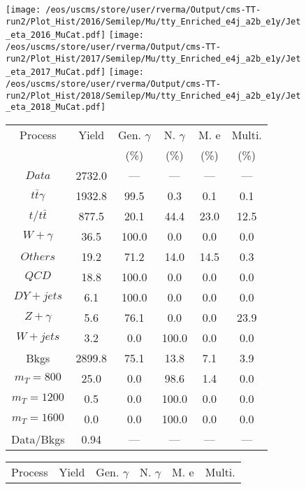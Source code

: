 \begin{figure}
\centering
\texttt{[image: /eos/uscms/store/user/rverma/Output/cms-TT-run2/Plot\_Hist/2016/Semilep/Mu/tty\_Enriched\_e4j\_a2b\_e1y/Jet\_eta\_2016\_MuCat.pdf]}
\texttt{[image: /eos/uscms/store/user/rverma/Output/cms-TT-run2/Plot\_Hist/2017/Semilep/Mu/tty\_Enriched\_e4j\_a2b\_e1y/Jet\_eta\_2017\_MuCat.pdf]}
\texttt{[image: /eos/uscms/store/user/rverma/Output/cms-TT-run2/Plot\_Hist/2018/Semilep/Mu/tty\_Enriched\_e4j\_a2b\_e1y/Jet\_eta\_2018\_MuCat.pdf]}
\begin{minipage}[c]{0.32\textwidth}
\centering
\tiny{
\begin{tabular}{cccccc}
\hline
Process & Yield & Gen. $\gamma$ & N. $\gamma$ & M. e & Multi. \\
 &  & (\%) & (\%) & (\%) & (\%)  \\
\hline
                                                                      $ Data $ &  2732.0 &  --- &  --- &  --- &  ---\\
$ t\bar{t}\gamma $ &  1932.8 &  99.5 &  0.3 &  0.1 &  0.1\\
$ t/t\bar{t} $ &  877.5 &  20.1 &  44.4 &  23.0 &  12.5\\
$ W+\gamma $ &  36.5 &  100.0 &  0.0 &  0.0 &  0.0\\
$ Others $ &  19.2 &  71.2 &  14.0 &  14.5 &  0.3\\
$ QCD $ &  18.8 &  100.0 &  0.0 &  0.0 &  0.0\\
$ DY+jets $ &  6.1 &  100.0 &  0.0 &  0.0 &  0.0\\
$ Z+\gamma $ &  5.6 &  76.1 &  0.0 &  0.0 &  23.9\\
$ W+jets $ &  3.2 &  0.0 &  100.0 &  0.0 &  0.0\\
Bkgs &  2899.8 &  75.1 &  13.8 &  7.1 &  3.9\\
$ m_{T} = 800 $ &  25.0 &  0.0 &  98.6 &  1.4 &  0.0\\
$ m_{T} = 1200 $ &  0.5 &  0.0 &  100.0 &  0.0 &  0.0\\
$ m_{T} = 1600 $ &  0.0 &  0.0 &  100.0 &  0.0 &  0.0\\
Data/Bkgs &  0.94 &  --- &  --- &  --- &  ---\\
\hline
\end{tabular}
}
\end{minipage}
\begin{minipage}[c]{0.32\textwidth}
\centering
\tiny{
\begin{tabular}{cccccc}
\hline
Process & Yield & Gen. $\gamma$ & N. $\gamma$ & M. e & Multi. \\

\end{tabular}}
\end{minipage}
\end{figure}
